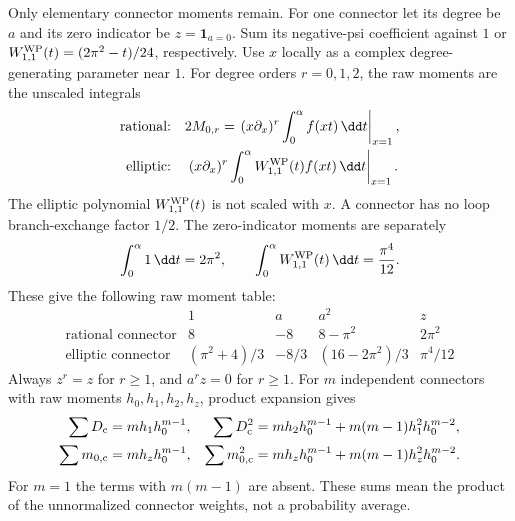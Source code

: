 Only elementary connector moments remain. For one connector let its
degree be $a$ and its zero indicator be $z=\mathbf1_{a=0}$. Sum its
negative-psi coefficient against $1$ or
$W^{\rm WP}_{1,1}(t)=(2\pi^2-t)/24$, respectively. Use $x$ locally
as a complex degree-generating parameter near $1$. For degree orders
$r=0,1,2$, the raw moments are the unscaled integrals
\[
\begin{aligned}
 \text{rational:}\quad &2M_{0,r}
 =\left.(x\partial_x)^r\int_0^\alpha f(xt)\,\dd t\right|_{x=1},\\
 \text{elliptic:}\quad &\left.(x\partial_x)^r
   \int_0^\alpha W^{\rm WP}_{1,1}(t)f(xt)\,\dd t\right|_{x=1}.
\end{aligned}
\]
The elliptic polynomial $W^{\rm WP}_{1,1}(t)$ is not scaled with $x$. A connector
has no loop branch-exchange factor $1/2$. The zero-indicator moments
are separately
\[
 \int_0^\alpha 1\,\dd t=2\pi^2,\qquad
 \int_0^\alpha W^{\rm WP}_{1,1}(t)\,\dd t=\frac{\pi^4}{12}.
\]
These give the following raw moment table:
\begin{equation}\label{eq:a:connector-moments}
\begin{array}{c|rrrr}
 &1&a&a^2&z\\\hline
 \text{rational connector}&8&-8&8-\pi^2&2\pi^2\\
 \text{elliptic connector}&(\pi^2+4)/3&-8/3&(16-2\pi^2)/3&\pi^4/12
\end{array}
\end{equation}
Always $z^r=z$
for $r\geq1$, and $a^r z=0$ for $r\geq1$. For $m$ independent
connectors with raw moments $h_0,h_1,h_2,h_z$, product expansion gives
\begin{align*}
 \sum D_{\rm c}&=mh_1h_0^{m-1},&
 \sum D_{\rm c}^2&=mh_2h_0^{m-1}+m(m-1)h_1^2h_0^{m-2},\\
 \sum m_{0,\rm c}&=mh_zh_0^{m-1},&
 \sum m_{0,\rm c}^2&=mh_zh_0^{m-1}+m(m-1)h_z^2h_0^{m-2}.
\end{align*}
For $m=1$ the terms with $m(m-1)$ are absent. These sums mean the
product of the unnormalized connector weights, not a probability
average.

